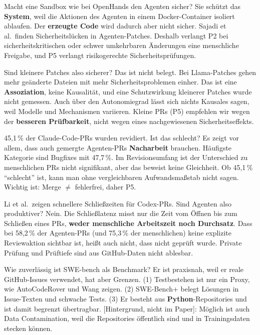 \documentclass[12pt,a4paper]{article}
\newcommand{\hg}{\textcolor{grau}{\small[Hintergrund, nicht im Paper]}}
\begin{document}
\begin{qa}{Macht eine Sandbox wie bei OpenHands den Agenten sicher?}
Sie schützt das \textbf{System}, weil die Aktionen des Agenten in einem Docker-Container isoliert ablaufen. Der \textbf{erzeugte Code} wird dadurch aber nicht sicher. Sajadi et al.\ finden Sicherheitslücken in Agenten-Patches. Deshalb verlangt P2 bei sicherheitskritischen oder schwer umkehrbaren Änderungen eine menschliche Freigabe, und P5 verlangt risikogerechte Sicherheitsprüfungen.
\end{qa}

\begin{qa}{Sind kleinere Patches also sicherer?}
Das ist nicht belegt. Bei Llama-Patches gehen mehr geänderte Dateien mit mehr Sicherheitsproblemen einher. Das ist eine \textbf{Assoziation}, keine Kausalität, und eine Schutzwirkung kleinerer Patches wurde nicht gemessen. Auch über den Autonomiegrad lässt sich nichts Kausales sagen, weil Modelle und Mechanismen variieren. Kleine PRs (P5) empfehlen wir wegen der \textbf{besseren Prüfbarkeit}, nicht wegen eines nachgewiesenen Sicherheitseffekts.
\end{qa}

\begin{qa}{45,1\,\% der Claude-Code-PRs wurden revidiert. Ist das schlecht?}
Es zeigt vor allem, dass auch gemergte Agenten-PRs \textbf{Nacharbeit} brauchen. Häufigste Kategorie sind Bugfixes mit 47,7\,\%. Im Revisionsumfang ist der Unterschied zu menschlichen PRs nicht signifikant, aber das beweist keine Gleichheit. Ob 45,1\,\% \enquote{schlecht} ist, kann man ohne vergleichbaren Aufwandsmaßstab nicht sagen. Wichtig ist: Merge $\neq$ fehlerfrei, daher P5.
\end{qa}

\begin{qa}{Li et al.\ zeigen schnellere Schließzeiten für Codex-PRs. Sind Agenten also produktiver?}
Nein. Die Schließlatenz misst nur die Zeit vom Öffnen bis zum Schließen eines PRs, \textbf{weder menschliche Arbeitszeit noch Durchsatz}. Dass bei 58,2\,\% der Agenten-PRs (und 75,3\,\% der menschlichen) keine explizite Reviewaktion sichtbar ist, heißt auch nicht, dass nicht geprüft wurde. Private Prüfung und Prüftiefe sind aus GitHub-Daten nicht ablesbar.
\end{qa}

\begin{qa}{Wie zuverlässig ist SWE-bench als Benchmark?}
Er ist praxisnah, weil er reale GitHub-Issues verwendet, hat aber Grenzen. (1) Testbestehen ist nur ein Proxy, wie AutoCodeRover und Wang zeigen. (2) SWE-Bench+ belegt Lösungen in Issue-Texten und schwache Tests. (3) Er besteht aus \textbf{Python}-Repositories und ist damit begrenzt übertragbar. \hg: Möglich ist auch Data Contamination, weil die Repositories öffentlich sind und in Trainingsdaten stecken können.
\end{qa}
\end{document}
